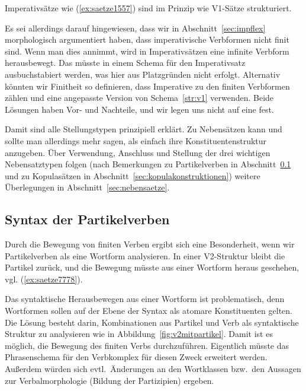 Imperativsätze wie (\ref{ex:saetze1557}) sind im Prinzip wie V1-Sätze strukturiert.

\begin{exe}
\end{exe}

Es sei allerdings darauf hingewiesen, dass wir in Abschnitt~\ref{sec:impflex} morphologisch argumentiert haben, dass imperativische Verbformen nicht finit sind.
Wenn man dies annimmt, wird in Imperativsätzen eine infinite Verbform herausbewegt.
Das müsste in einem Schema für den Imperativsatz ausbuchstabiert werden, was hier aus Platzgründen nicht erfolgt.
Alternativ könnten wir Finitheit so definieren, dass Imperative zu den finiten Verbformen zählen und eine angepasste Version von Schema~\ref{str:v1} verwenden.
Beide Lösungen haben Vor- und Nachteile, und wir legen uns nicht auf eine fest.


Damit sind alle Stellungstypen prinzipiell erklärt.
Zu Nebensätzen kann und sollte man allerdings mehr sagen, als einfach ihre Konstituentenstruktur anzugeben.
Über Verwendung, Anschluss und Stellung der drei wichtigen Nebensatztypen folgen (nach Bemerkungen zu Partikelverben in Abschnitt~\ref{sec:partikelverben} und zu Kopulasätzen in Abschnitt~\ref{sec:kopulakonstruktionen}) weitere Überlegungen in Abschnitt~\ref{sec:nebensaetze}.


\subsection{Syntax der Partikelverben}

\label{sec:partikelverben}

Durch die Bewegung von finiten Verben ergibt sich eine Besonderheit, wenn wir Partikelverben als eine Wortform analysieren.
In einer V2-Struktur bleibt die Partikel zurück, und die Bewegung müsste aus einer Wortform heraus geschehen, vgl. (\ref{ex:saetze7778}).

\begin{exe}
\end{exe}


Das syntaktische Herausbewegen aus einer Wortform ist problematisch, denn Wortformen sollen auf der Ebene der Syntax als atomare Konstituenten gelten.
Die Lösung besteht darin, Kombinationen aus Partikel und Verb als syntaktische Struktur zu analysieren wie in Abbildung~\ref{fig:v2mitpartikel}.
Damit ist es möglich, die Bewegung des finiten Verbs durchzuführen.
Eigentlich müsste das Phrasenschema für den Verbkomplex für diesen Zweck erweitert werden.
Außerdem würden sich evtl.\ Änderungen an den Wortklassen bzw.\ den Aussagen zur Verbalmorphologie (\zB Bildung der Partizipien) ergeben.

